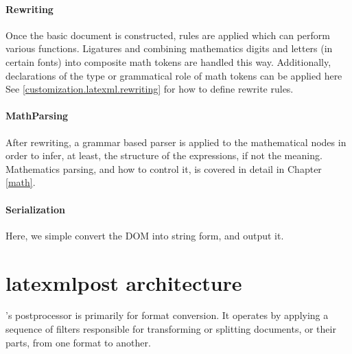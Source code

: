 \documentclass{book}
\begin{document}
\paragraph{Rewriting}\label{architecture.latexml.rewriting}
%
Once the basic document is constructed,  rules are applied which can
perform various functions. Ligatures and combining mathematics digits and letters (in certain fonts)
into composite math tokens are handled this way.  Additionally, declarations
of the type or grammatical role of math tokens can be applied here
See \ref{customization.latexml.rewriting} for how to define rewrite rules.

\paragraph{MathParsing}\label{architecture.latexml.mathparsing}
%
After rewriting, a grammar based parser is applied to the mathematical
nodes in order to infer, at least, the structure of the expressions,
if not the meaning.
Mathematics parsing, and how to control it, is covered in detail in Chapter \ref{math}.

\paragraph{Serialization}\label{architecture.latexml.serialization}
Here, we simple convert the DOM into string form, and output it.

\section{latexmlpost architecture}\label{architecture.latexmlpost}
%
\LaTeXML's postprocessor is primarily for format conversion.
It operates by applying a sequence of filters responsible for
transforming or splitting documents, or their parts, from one format to another.
\end{document}
